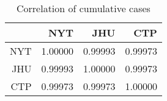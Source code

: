 \begin{table}[ht]
\centering
\begin{tabular}{rrrr}
  \hline
 & NYT & JHU & CTP \\ 
  \hline
NYT & 1.00000 & 0.99993 & 0.99973 \\ 
  JHU & 0.99993 & 1.00000 & 0.99973 \\ 
  CTP & 0.99973 & 0.99973 & 1.00000 \\ 
   \hline
\end{tabular}
\caption{Correlation of cumulative cases \label{tab:casecor}} 
\end{table}
